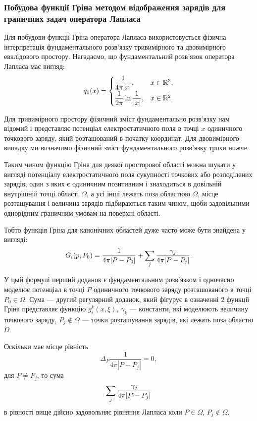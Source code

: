\subsubsection{Побудова функції Гріна методом відображення зарядів для граничних задач оператора Лапласа}

Для побудови функції Гріна оператора Лапласа використовується фізична інтерпретація фундаментального розв'язку тривимірного та двовимірного евклідового простору. Нагадаємо, що фундаментальний розв'язок оператора Лапласа має вигляд:
\begin{equation}
	q_0(x) = \begin{cases}
		\dfrac{1}{4 \pi |x|}, & x \in \mathbb{R}^3, \\
		\dfrac{1}{2 \pi} \ln \dfrac{1}{|x|}, & x \in \mathbb{R}^2.
	\end{cases}
\end{equation}

Для тривимірного простору фізичний зміст фундаментально розв'язку нам відомий і представляє потенціал електростатичного поля в точці $x$ одиничного точкового заряду, який розташований в початку координат. Для двовимірного випадку ми визначимо фізичний зміст фундаментального розв'язку трохи нижче. \medskip

Таким чином функцію Гріна для деякої просторової області можна шукати у вигляді потенціалу електростатичного поля сукупності точкових або розподілених зарядів, один з яких є одиничним позитивним і знаходиться в довільній внутрішній точці області $\Omega$, а усі інші лежать поза областюю $\Omega$, місце розташування і величина зарядів підбираються таким чином, щоби задовільними однорідним граничним умовам на поверхні області. \medskip

Тобто функція Гріна для канонічних областей дуже часто може бути знайдена у вигляді:
\begin{equation}
	G_i(p, P_0) = \frac{1}{4 \pi |P - P_0|} + \displaystyle\sum\limits_j \frac{\gamma_j}{4 \pi |P - P_j|}.
\end{equation}

У цый формулі перший доданок є фундаментальним розв'язком і одночасно моделює потенціал в точці $P$ одиничного точкового заряду розташованого в точці $P_0 \in \Omega$. Сума --- другий регулярний доданок, який фігурує в означенні 2 функції Гріна представляє функцію  $g_i^k(x, \xi)$, $\gamma_k$ --- константи, які моделюють величину точкового заряду, $P_j \notin \Omega$ --- точки розташування зарядів, які лежать поза областю $\Omega$. \medskip

Оскільки має місце рівність
\begin{equation}
	\Delta_P \frac{1}{4 \pi |P - P_j|} = 0,
\end{equation}
для $P \ne P_j$, то сума
\begin{equation}
	\displaystyle\sum\limits_j \frac{\gamma_j}{4 \pi |P - P_j|}
\end{equation}
в рівності вище дійсно задовольняє рівняння Лапласа коли $P \in \Omega$, $P_j \notin \Omega$.

